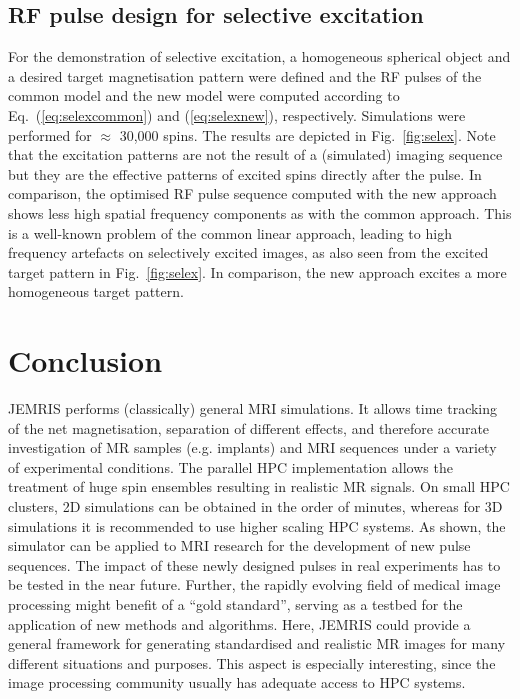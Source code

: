 \documentclass{nic-series}
\begin{document}
\subsection{RF pulse design for selective excitation}
For the demonstration of selective excitation, a homogeneous spherical object and a desired target
magnetisation pattern were defined and the RF pulses of the common model and the new model were computed
according to Eq.~(\ref{eq:selexcommon}) and (\ref{eq:selexnew}), respectively. Simulations were performed for $\approx$ 30,000 spins.
The results are depicted in Fig.~\ref{fig:selex}. Note that the excitation patterns are not the result of a (simulated) imaging sequence
but they are the effective patterns of excited spins directly after the pulse. In comparison, the optimised RF pulse
sequence computed with the new approach shows less high spatial frequency components as with the common
approach. This is a well-known problem of the common linear approach, leading to high frequency artefacts on
selectively excited images, as also seen from the excited target pattern in Fig.~\ref{fig:selex}. In comparison, the new approach
excites a more homogeneous target pattern.
\section{Conclusion}
JEMRIS performs (classically) general MRI simulations. It allows time tracking of the net magnetisation, separation
of different effects, and therefore accurate investigation of MR samples (e.g. implants) and MRI sequences under a
variety of experimental conditions. The parallel HPC implementation allows the treatment of huge spin ensembles
resulting in realistic MR signals. On small HPC clusters, 2D simulations can be obtained in the order of minutes,
whereas for 3D simulations it is recommended to use higher scaling HPC systems. As shown, the simulator can be
applied to MRI research for the development of new pulse sequences. The impact of these newly designed pulses in real
experiments has to be tested in the near future.
Further, the rapidly evolving field of medical image processing might benefit of a “gold standard”, serving as a testbed
for the application of new methods and algorithms. Here, JEMRIS could provide a general framework for generating
standardised and realistic MR images for many different situations and purposes. This aspect is especially interesting,
since the image processing community usually has adequate access to HPC systems.
\end{document}
